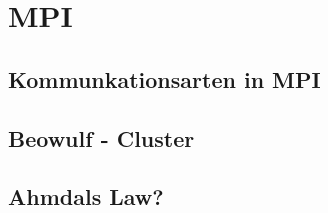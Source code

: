 \section{MPI}

\subsection{Kommunkationsarten in MPI}
\subsection{Beowulf - Cluster}
\subsection{Ahmdals Law?}